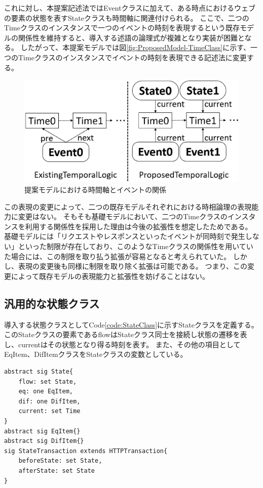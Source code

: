 \documentclass[journal]{IEEEtran}
\begin{document}
これに対し、本提案記述法ではEventクラスに加えて、ある時点におけるウェブの要素の状態を表すStateクラスも時間軸に関連付けられる。
ここで、二つのTimeクラスのインスタンスで一つのイベントの時刻を表現するという既存モデルの関係性を維持すると、導入する述語の論理式が複雑となり実装が困難となる。
したがって、本提案モデルでは図\ref{fig:ProposedModel-TimeClass}に示す、一つのTimeクラスのインスタンスでイベントの時刻を表現できる記述法に変更する。

\begin{figure}[htb]
\centering
\includegraphics[width=\hsize]{./fig/TimeClass.eps}
\caption{提案モデルにおける時間軸とイベントの関係}
\label{fig:TimeClass}
\end{figure}

この表現の変更によって、二つの既存モデルそれぞれにおける時相論理の表現能力に変更はない。
そもそも基礎モデルにおいて、二つのTimeクラスのインスタンスを利用する関係性を採用した理由は今後の拡張性を想定したためである。
基礎モデルには「リクエストやレスポンスといったイベントが同時刻で発生しない」といった制限が存在しており、このようなTimeクラスの関係性を用いていた場合には、この制限を取り払う拡張が容易となると考えられていた。
しかし、表現の変更後も同様に制限を取り除く拡張は可能である。
つまり、この変更によって既存モデルの表現能力と拡張性を妨げることはない。

\subsection{汎用的な状態クラス}
\label{sec:state-class}
導入する状態クラスとしてCode\ref{code:StateClass}に示すStateクラスを定義する。
このStateクラスの要素であるflowはStateクラス同士を接続し状態の遷移を表し、currentはその状態となり得る時刻を表す。
また、その他の項目としてEqItem、DifItemクラスをStateクラスの変数としている。
\begin{lstlisting}[caption=Stateクラス, label=code:StateClass]
abstract sig State{
	flow: set State,
	eq: one EqItem,
	dif: one DifItem,
	current: set Time
}
abstract sig EqItem{}
abstract sig DifItem{}
sig StateTransaction extends HTTPTransaction{
	beforeState: set State,
	afterState: set State
}
\end{lstlisting}
\end{document}
